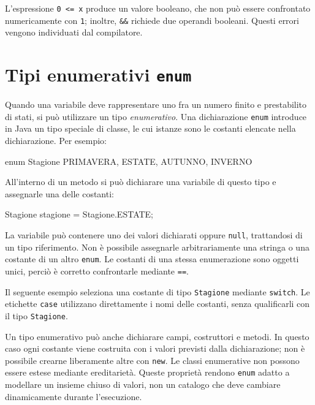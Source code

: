 L'espressione \texttt{0 <= x} produce un valore booleano, che
non può essere confrontato numericamente con \texttt{1}; inoltre,
\texttt{\&\&} richiede due operandi booleani. Questi errori
vengono individuati dal compilatore.

\section{Tipi enumerativi \texttt{enum}}
\label{sec:fi-java-cicli-enum}

Quando una variabile deve rappresentare uno fra un numero finito e
prestabilito di stati, si può utilizzare un tipo \emph{enumerativo}.
Una dichiarazione \texttt{enum} introduce in Java un tipo speciale
di classe, le cui istanze sono le costanti elencate nella
dichiarazione. Per esempio:

\begin{unipdcode}[language=Java]
enum Stagione {
    PRIMAVERA, ESTATE, AUTUNNO, INVERNO
}
\end{unipdcode}

All'interno di un metodo si può dichiarare una variabile di questo
tipo e assegnarle una delle costanti:
\begin{unipdcode}[language=Java]
Stagione stagione = Stagione.ESTATE;
\end{unipdcode}

La variabile può contenere uno dei valori dichiarati oppure
\texttt{null}, trattandosi di un tipo riferimento. Non è possibile
assegnarle arbitrariamente una stringa o una costante di un altro
\texttt{enum}. Le costanti di una stessa enumerazione sono oggetti
unici, perciò è corretto confrontarle mediante \texttt{==}.

\begin{example}
Il seguente esempio seleziona una costante di tipo
\texttt{Stagione} mediante \texttt{switch}. Le etichette
\texttt{case} utilizzano direttamente i nomi delle costanti,
senza qualificarli con il tipo \texttt{Stagione}.

\end{example}

Un tipo enumerativo può anche dichiarare campi, costruttori e
metodi. In questo caso ogni costante viene costruita con i valori
previsti dalla dichiarazione; non è possibile crearne liberamente
altre con \texttt{new}. Le classi enumerative non possono essere
estese mediante ereditarietà. Queste proprietà rendono
\texttt{enum} adatto a modellare un insieme chiuso di valori,
non un catalogo che deve cambiare dinamicamente durante
l'esecuzione.

